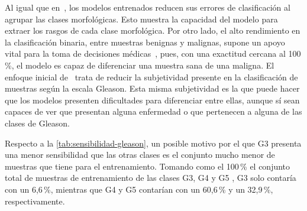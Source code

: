Al igual que en~\cite{ayensa2026}, los modelos entrenados reducen sus errores de clasificación al agrupar las clases morfológicas. Esto muestra la capacidad del modelo para extraer los rasgos de cada clase morfológica. Por otro lado, el alto rendimiento en la clasificación binaria, entre muestras benignas y malignas, supone un apoyo vital para la toma de decisiones médicas~\cite{ayensa2026}, pues, con una exactitud cercana al 100\,\%, el modelo es capaz de diferenciar una muestra sana de una maligna. El enfoque inicial  de~\cite{ayensa2026} trata de reducir la subjetividad presente en la clasificación de muestras según la escala Gleason. Esta misma subjetividad es la que puede hacer que los modelos presenten dificultades para diferenciar entre ellas, aunque sí sean capaces de ver que presentan alguna enfermedad o que pertenecen a alguna de las clases de Gleason.



Respecto a la \cref{tab:sensibilidad-gleason}, un posible motivo por el que G3 presenta una menor sensibilidad que las otras clases es el conjunto mucho menor de muestras que tiene para el entrenamiento. Tomando como el 100\,\% el conjunto total de muestras de entrenamiento de las clases G3, G4 y G5 , G3 solo contaría con un 6,6\,\%, mientras que G4 y G5 contarían con un 60,6\,\% y un 32,9\,\%, respectivamente.

